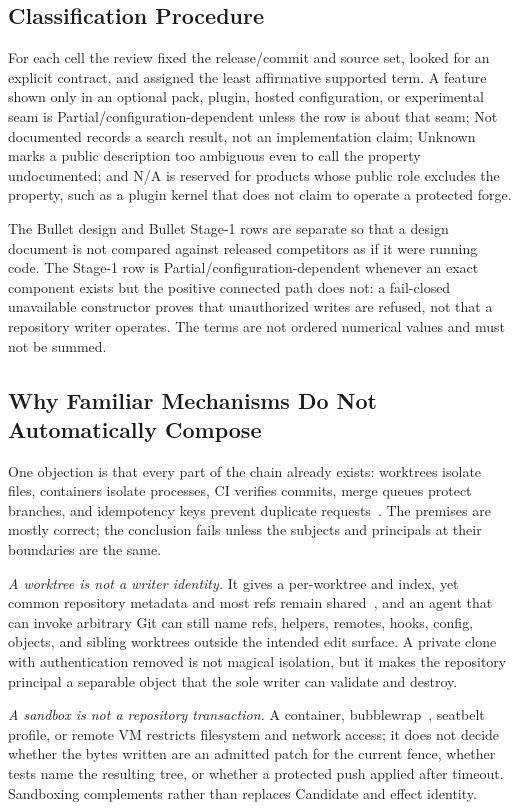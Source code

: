 \documentclass[journal]{IEEEtran}
\newcommand{\Partial}{\textsf{Partial/configuration-dependent}}
\newcommand{\NotDoc}{\textsf{Not documented}}
\newcommand{\Unknown}{\textsf{Unknown}}
\newcommand{\NA}{\textsf{N/A}}
\newcommand{\code}[1]{\texttt{\detokenize{#1}}}
\begin{document}
\subsection{Classification Procedure}

For each cell the review fixed the release/commit and source set, looked for
an explicit contract, and assigned the least affirmative supported term. A
feature shown only in an optional pack, plugin, hosted configuration, or
experimental seam is \Partial{} unless the row is about that seam; \NotDoc{}
records a search result, not an implementation claim; \Unknown{} marks a
public description too ambiguous even to call the property undocumented; and
\NA{} is reserved for products whose public role excludes the property, such
as a plugin kernel that does not claim to operate a protected forge.

The Bullet design and Bullet Stage-1 rows are separate so that a design
document is not compared against released competitors as if it were running
code. The Stage-1 row is \Partial{} whenever an exact component exists but the
positive connected path does not: a fail-closed unavailable constructor proves
that unauthorized writes are refused, not that a repository writer operates.
The terms are not ordered numerical values and must not be summed.

\subsection{Why Familiar Mechanisms Do Not Automatically Compose}

One objection is that every part of the chain already exists: worktrees
isolate files, containers isolate processes, CI verifies commits, merge queues
protect branches, and idempotency keys prevent duplicate
requests~\cite{idempotencyKey}. The premises are mostly correct; the
conclusion fails unless the subjects and principals at their boundaries are
the same.

\emph{A worktree is not a writer identity.} It gives a per-worktree
\code{HEAD} and index, yet common repository metadata and most refs remain
shared~\cite{gitWorktree}, and an agent that can invoke arbitrary Git can
still name refs, helpers, remotes, hooks, config, objects, and sibling
worktrees outside the intended edit surface. A private clone with
authentication removed is not magical isolation, but it makes the repository
principal a separable object that the sole writer can validate and destroy.

\emph{A sandbox is not a repository transaction.} A container,
bubblewrap~\cite{bubblewrap}, seatbelt profile, or remote VM restricts
filesystem and network access; it does not decide whether the bytes written
are an admitted patch for the current fence, whether tests name the resulting
tree, or whether a protected push applied after timeout. Sandboxing
complements rather than replaces Candidate and effect identity.
\end{document}
